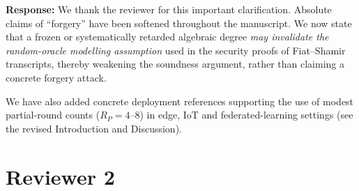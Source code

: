 \documentclass[preprint, 11pt]{article}
\newcounter{reviewerid}
\newcounter{reviewercounter}[reviewerid]
\begin{document}
\begin{enumerate}[leftmargin=1.5em, itemsep=1.2em]
    \textbf{Response:}
    We thank the reviewer for this important clarification. Absolute claims of ``forgery'' have been softened throughout the manuscript. We now state that a frozen or systematically retarded algebraic degree \emph{may invalidate the random-oracle modelling assumption} used in the security proofs of Fiat–Shamir transcripts, thereby weakening the soundness argument, rather than claiming a concrete forgery attack.

    We have also added concrete deployment references supporting the use of modest partial-round counts (\(R_P=4\)–\(8\)) in edge, IoT and federated-learning settings (see the revised Introduction and Discussion).

\end{enumerate}

\vspace{2em}

\setcounter{reviewercounter}{0}
\setcounter{reviewerid}{2}
\section*{Reviewer 2}
\end{document}
